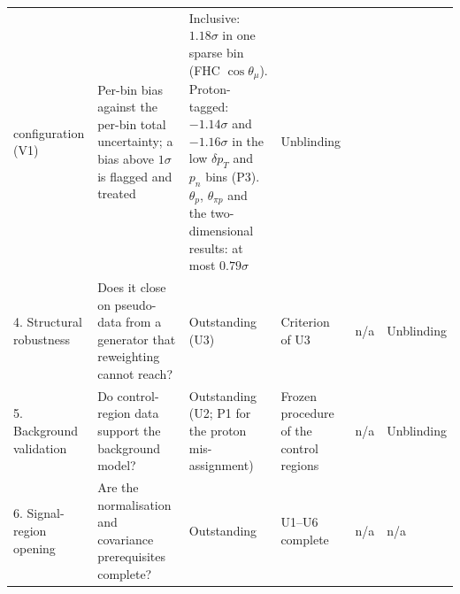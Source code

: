 {\begin{longtable}{@{}p{1.9cm}p{2.7cm}p{2.6cm}p{2.7cm}p{2.9cm}p{1.6cm}@{}}
  configuration (V1) &
  Per-bin bias against the per-bin total uncertainty; a bias above $1\sigma$ is flagged and treated &
  Inclusive: $1.18\sigma$ in one sparse bin (FHC $\cos\theta_\mu$). Proton-tagged: $-1.14\sigma$ and
  $-1.16\sigma$ in the low $\delta p_T$ and $p_n$ bins (P3). $\theta_p$, $\theta_{\pi p}$ and the
  two-dimensional results: at most $0.79\sigma$ & Unblinding \\
4. Structural robustness & Does it close on pseudo-data from a generator that reweighting cannot reach? &
  Outstanding (U3) & Criterion of U3 & n/a & Unblinding \\
5. Background validation & Do control-region data support the background model? &
  Outstanding (U2; P1 for the proton mis-assignment) &
  Frozen procedure of the control regions & n/a & Unblinding \\
6. Signal-region opening & Are the normalisation and covariance prerequisites complete? &
  Outstanding & U1--U6 complete & n/a & n/a \\
\end{longtable}}
